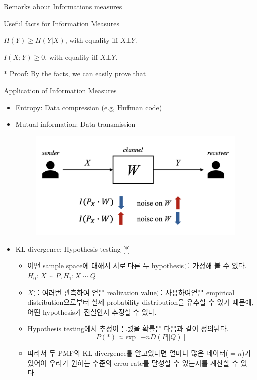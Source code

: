 \documentclass[9pt]{beamer}
\begin{document}
\begin{section}{Remarks about Informations measures}
\begin{frame}{Useful facts for Information Measures}
            \begin{corollary}
                $H(Y) \ge H(Y|X)$, with equality iff $X \bot Y$.
            \end{corollary}
            
            \begin{corollary}
                $I(X; Y) \ge 0$, with equality iff $X \bot Y$.
            \end{corollary}
            
            $\ast$ \underline{Proof}: By the facts, we can easily prove that
            \vspace{3cm}
        
        \end{frame}

        \begin{frame}{Application of Information Measures}
            \begin{itemize}
                \item Entropy: Data compression (e.g, Huffman code)
                \item Mutual information: Data transmission
                \begin{figure}
                    \includegraphics[width=0.55\columnwidth]{image/L2-transmission.png}
                \end{figure}
                \item KL divergence: Hypothesis testing [$\ast$]
                \begin{itemize}
                    \item 어떤 sample space에 대해서 서로 다른 두 hypothesis를 가정해 볼 수 있다.\\ $H_0$: $X \sim P, H_1: X \sim Q$
                    \item $X$를 여러번 관측하여 얻은 realization value를 사용하여얻은 empirical distribution으로부터 실제 probability distribution을 유추할 수 있기 때문에, 어떤 hypothesis가 진실인지 추정할 수 있다.
                    \item Hypothesis testing에서 추정이 틀렸을 확률은 다음과 같이 정의된다.
                    $$P(*) \approx \text{exp}[-n D(P||Q)]$$ 
                    \item 따라서 두 PMF의 KL divergence를 알고있다면 얼마나 많은 데이터($=n$)가 있어야 우리가 원하는 수준의 error-rate를 달성할 수 있는지를 계산할 수 있다.
                    
                \end{itemize}
            \end{itemize}
        \end{frame}
    \end{section}
\end{document}
